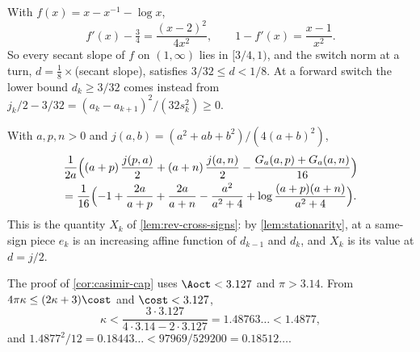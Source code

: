  With $f(x)=x-x^{-1}-\log x$,
\[
  f'(x)-\tfrac34=\frac{(x-2)^2}{4x^2},\qquad 1-f'(x)=\frac{x-1}{x^2}.
\]
So every secant slope of $f$ on $(1,\infty)$ lies in $[3/4,1)$, and the switch norm at a turn,
$d=\frac18\times$(secant slope), satisfies $3/32\le d<1/8$. At a forward switch the lower bound
$d_k\ge3/32$ comes instead from
$j_k/2-3/32=(a_k-a_{k+1})^2/(32s_k^2)\ge0$.

 With $a,p,n>0$ and $j(a,b)=(a^2+ab+b^2)/(4(a+b)^2)$,
\begin{multline*}
  \frac{1}{2a}\Bigl((a+p)\,\frac{j(p,a)}{2}+(a+n)\,\frac{j(a,n)}{2}
  -\frac{G_a(a,p)+G_a(a,n)}{16}\Bigr)\\
  =\frac{1}{16}\Bigl(-1+\frac{2a}{a+p}+\frac{2a}{a+n}-\frac{a^2}{a^2+4}
  +\log\frac{(a+p)(a+n)}{a^2+4}\Bigr).
\end{multline*}
This is the quantity $X_k$ of \cref{lem:rev-cross-signs}: by
\cref{lem:stationarity}, at a same-sign piece $e_k$ is an increasing affine function of
$d_{k-1}$ and $d_k$, and $X_k$ is its value at $d=j/2$.

 The proof of \cref{cor:casimir-cap} uses $\Aoct<3.127$ and $\pi>3.14$. From $4\pi\kappa\le(2\kappa+3)\cost$ and
$\cost<3.127$,
\[
  \kappa<\frac{3\cdot3.127}{4\cdot3.14-2\cdot3.127}=1.48763\ldots<1.4877,
\]
and $1.4877^2/12=0.18443\ldots<97969/529200=0.18512\ldots$.

